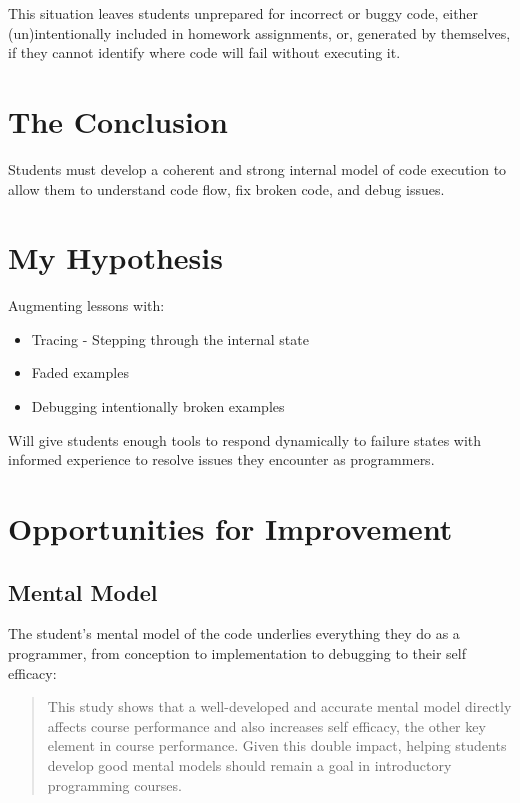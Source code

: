 \documentclass[paper=a4,]{tufte-handout}
\providecommand{\tightlist}{%
  \setlength{\itemsep}{0pt}\setlength{\parskip}{0pt}}
\begin{document}
This situation leaves students unprepared for incorrect or buggy code,
either (un)intentionally included in homework assignments, or, generated
by themselves, if they cannot identify where code will fail without
executing it.

\hypertarget{the-conclusion}{%
\section{The Conclusion}\label{the-conclusion}}

Students must develop a coherent and strong internal model of code
execution to allow them to understand code flow, fix broken code, and
debug issues.

\hypertarget{my-hypothesis}{%
\section{My Hypothesis}\label{my-hypothesis}}

Augmenting lessons with:

\begin{itemize}
\tightlist
\item
  Tracing - Stepping through the internal state
\item
  Faded examples
\item
  Debugging intentionally broken examples
\end{itemize}

Will give students enough tools to respond dynamically to failure states
with informed experience to resolve issues they encounter as
programmers.

\hypertarget{opportunities-for-improvement}{%
\section{Opportunities for
Improvement}\label{opportunities-for-improvement}}

\hypertarget{mental-model}{%
\subsection{Mental Model}\label{mental-model}}

The student's mental model of the code underlies everything they do as a
programmer, from conception to implementation to debugging to their self
efficacy:

\begin{quote}
This study shows that a well-developed and accurate mental model
directly affects course performance and also increases self efficacy,
the other key element in course performance. Given this double impact,
helping students develop good mental models should remain a goal in
introductory programming courses. \citep{Ramalingam_2004}
\end{quote}
\end{document}
